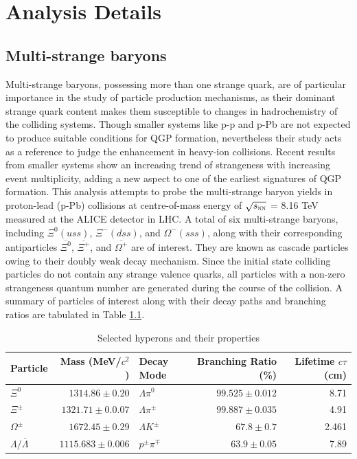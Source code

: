 \chapter{Analysis Details}

\section{Multi-strange baryons}
Multi-strange baryons, possessing more than one strange quark, are of particular importance in the study of particle production mechanisms, as their dominant
strange quark content makes them susceptible to changes in hadrochemistry of the colliding systems. Though smaller systems like p-p and p-Pb are not expected
to produce suitable conditions for QGP formation, nevertheless their study acts as a reference to judge the enhancement in heavy-ion collisions. Recent
results from smaller systems show an increasing trend of strangeness with increasing event multiplicity, adding a new aspect to one of the earliest
signatures of QGP formation. This analysis attempts to probe the multi-strange
baryon yields in proton-lead (p-Pb) collisions at centre-of-mass energy of $\sqrt{s_{\textnormal{\sc nn}}}$ = 8.16 TeV measured at the ALICE detector in
LHC. A total of six multi-strange baryons, including $\Xi^{0} (uss)$, $\Xi^{-} (dss)$, and $\Omega^{-} (sss)$, along with their corresponding antiparticles
$\overline{\Xi^{0}}$, $\overline{\Xi^{+}}$, and $\overline{\Omega^{+}}$ are of interest. They are known as cascade particles owing to their doubly weak
decay mechanism.
Since the initial state colliding particles do not contain any strange valence quarks, all particles with a non-zero strangeness quantum number are
generated during the course of the collision. A summary of particles of interest along with their decay paths and branching ratios are tabulated in
Table \ref{tab:cascades}.

\begin{table}[H]
    \centering
    \begin{tabular}{|l|r|l|r|r|}
        \hline
        Particle                       & Mass (MeV/$c^{2}$)   & Decay Mode          & Branching Ratio (\%) & Lifetime $c\tau$ (cm) \\ \hline
        $\Xi^{0}$                      & $1314.86 \pm 0.20$   & $\Lambda \pi^{0}$   & $99.525 \pm 0.012$   & 8.71                  \\ \hline
        $\Xi^{\pm}$                    & $1321.71 \pm 0.0.07$ & $\Lambda \pi^{\pm}$ & $99.887 \pm 0.035$   & 4.91                  \\ \hline
        $\Omega^{\pm}$                 & $1672.45 \pm 0.29$   & $\Lambda K^{\pm}$   & $67.8 \pm 0.7$       & 2.461                 \\ \hline
        $\Lambda / \overline{\Lambda}$ & $1115.683 \pm 0.006$ & $p^{\pm} \pi^{\mp}$ & $63.9 \pm 0.05$      & 7.89                  \\ \hline
    \end{tabular}
    \caption{Selected hyperons and their properties\cite{Pdg:2018}}
    \label{tab:cascades}
\end{table}


